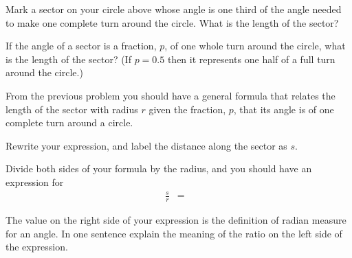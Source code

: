 \begin{problem}
\begin{subproblem}
    \vspace{4em}

  \item Mark a sector on your circle above whose angle is one third of
    the angle needed to make one complete turn around the circle. What
    is the length of the sector?  


    \vspace{4em}

  \item If the angle of a sector is a fraction, $p$, of one whole turn around
    the circle, what is the length of the sector? (If $p=0.5$ then it represents
    one half of a full turn around the circle.)
    \vspace{4em}

  \end{subproblem}

\clearpage

\item From the previous problem you should have a general formula that
  relates the length of the sector with radius $r$ given the
  fraction, $p$, that its angle is of one complete turn around a
  circle.

  \begin{subproblem}
  \item Rewrite your expression, and label the distance along the
    sector as $s$.
    \vfill
  \item Divide both sides of your formula by the radius, and you
    should have an expression for
    \begin{eqnarray*}
    \frac{s}{r} & = &
    \end{eqnarray*}

  \item The value on the right side of your expression is the
    definition of radian measure for an angle. In one sentence explain
    the meaning of the ratio on the left side of the expression.

    \vfill

  \end{subproblem}

  \clearpage


\end{problem}
